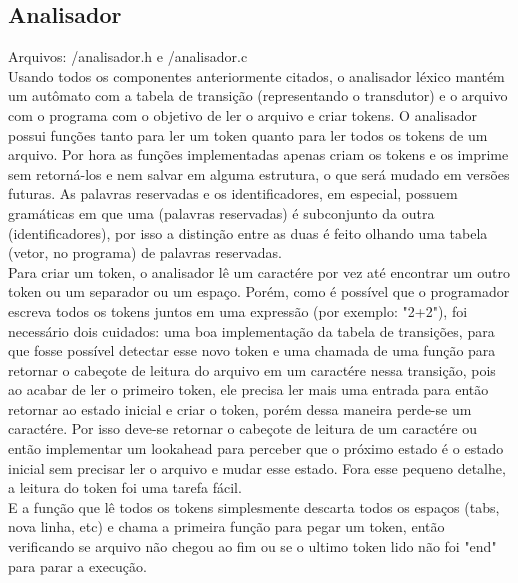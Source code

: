 \subsection{Analisador}
Arquivos: /analisador.h e /analisador.c\\
Usando todos os componentes anteriormente citados, o analisador léxico mantém um autômato com a tabela de transição (representando o transdutor) e o arquivo com o programa com o objetivo de ler o arquivo e criar tokens. O analisador possui funções tanto para ler um token quanto para ler todos os tokens de um arquivo. Por hora as funções implementadas apenas criam os tokens e os imprime sem retorná-los e nem salvar em alguma estrutura, o que será mudado em versões futuras. As palavras reservadas e os identificadores, em especial, possuem gramáticas em que uma (palavras reservadas) é subconjunto da outra (identificadores), por isso a distinção entre as duas é feito olhando uma tabela (vetor, no programa) de palavras reservadas.\\
Para criar um token, o analisador lê um caractére por vez até encontrar um outro token ou um separador ou um espaço. Porém, como é possível que o programador escreva todos os tokens juntos em uma expressão (por exemplo: "2+2"), foi necessário dois cuidados: uma boa implementação da tabela de transições, para que fosse possível detectar esse novo token e uma chamada de uma função para retornar o cabeçote de leitura do arquivo em um caractére nessa transição, pois ao acabar de ler o primeiro token, ele precisa ler mais uma entrada para então retornar ao estado inicial e criar o token, porém dessa maneira perde-se um caractére. Por isso deve-se retornar o cabeçote de leitura de um caractére ou então implementar um lookahead para perceber que o próximo estado é o estado inicial sem precisar ler o arquivo e mudar esse estado. Fora esse pequeno detalhe, a leitura do token foi uma tarefa fácil.\\
E a função que lê todos os tokens simplesmente descarta todos os espaços (tabs, nova linha, etc) e chama a primeira função para pegar um token, então verificando se arquivo não chegou ao fim ou se o ultimo token lido não foi "end" para parar a execução.

